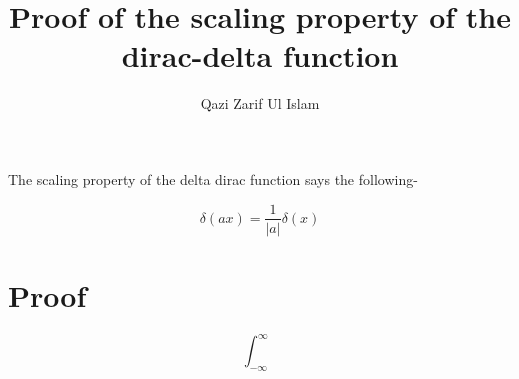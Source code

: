 \documentclass[a4paper]{article}
\title{Proof of the scaling property of the dirac-delta function}
\author{Qazi Zarif Ul Islam}
\begin{document}
\maketitle

\noindent The scaling property of the delta dirac function says the following-

\begin{equation}
    \delta(ax) = \frac{1}{|a|} \delta(x)
\end{equation}

\section*{Proof}

\begin{equation}
    \int_{-\infty}^{\infty}
\end{equation}
                                                                                                                                
\end{document}
